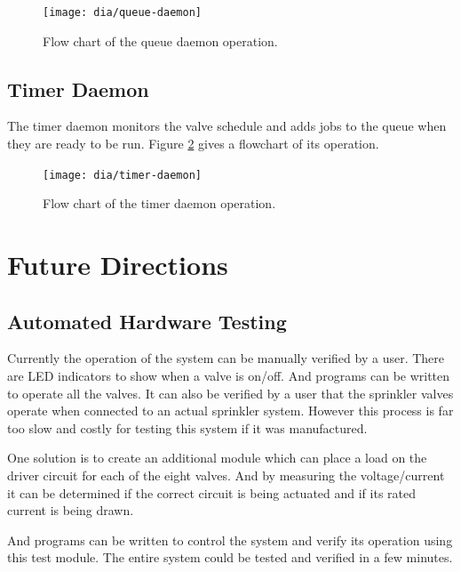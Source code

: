 \documentclass{article}
\begin{document}
\begin{figure}[htbp!]
\begin{center}
\texttt{[image: dia/queue-daemon]}
\end{center}
\caption{Flow chart of the queue daemon operation.}
\label{fig:queue-daemon}
\end{figure}


\clearpage
\FloatBarrier
\subsection{Timer Daemon}

The timer daemon monitors the valve schedule and adds jobs
to the queue when they are ready to be run.
Figure \ref{fig:timer-daemon} gives a flowchart of its operation.

\begin{figure}[htbp!]
\begin{center}
\texttt{[image: dia/timer-daemon]}
\end{center}
\caption{Flow chart of the timer daemon operation.}
\label{fig:timer-daemon}
\end{figure}


\section{Future Directions}

\FloatBarrier
\subsection{Automated Hardware Testing}

Currently the operation of the system can be manually
verified by a user.  There are LED indicators to show
when a valve is on/off.  And programs can be written
to operate all the valves.
It can also be verified by a user that the sprinkler
valves operate when connected to an actual sprinkler
system.
However this process is far too slow and costly for
testing this system if it was manufactured.

One solution is to create an additional module which
can place a load on the driver circuit for each of
the eight valves.
And by measuring the voltage/current it can be determined
if the correct circuit is being actuated and if
its rated current is being drawn.

And programs can be written to control the system and
verify its operation using this test module.
The entire system could be tested and verified in a
few minutes.
\end{document}
